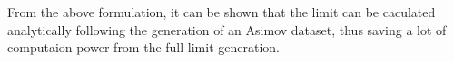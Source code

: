 %
%


%


From the above formulation, it can be shown that the limit can be caculated analytically following the generation of an Asimov dataset, thus saving a lot of computaion power from the full limit generation. 



